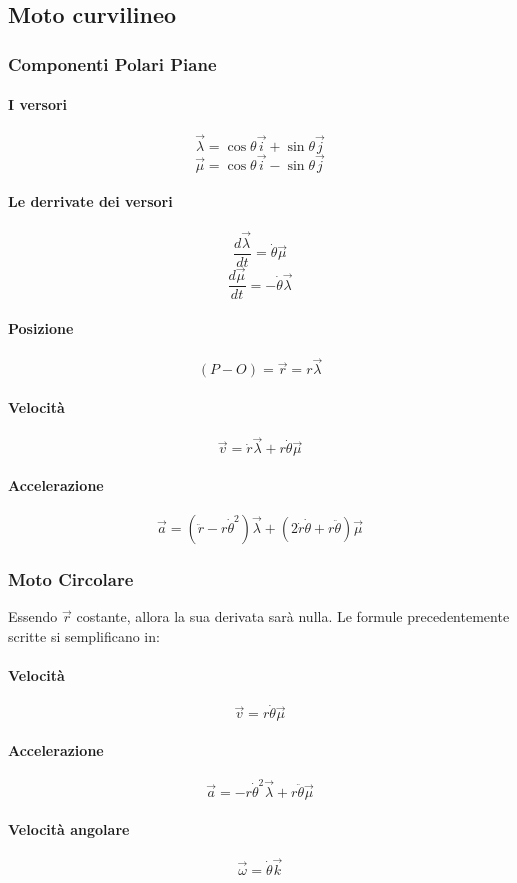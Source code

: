 \documentclass[12pt,a4paper]{report}
\begin{document}
	\subsection{Moto curvilineo}
		\subsubsection{Componenti Polari Piane}
			\paragraph{I versori}						
			\[\vec{\lambda} = \cos\theta\vec{i} + \sin\theta\vec{j}\]
			\[\vec{\mu} = \cos\theta\vec{i} - \sin\theta\vec{j}\]	
			\paragraph{Le derrivate dei versori}		
			\[\frac{d\vec{\lambda}}{dt}=\dot{\theta}\vec{\mu} \] 
			\[\frac{d\vec{\mu}}{dt}=-\dot{\theta}\vec{\lambda}\]
			\paragraph{Posizione}	
			\[(P-O)=\vec{r}=r\vec{\lambda}\]
			\paragraph{Velocità}	
			\[\vec{v}=\dot{r}\vec{\lambda}+r\dot{\theta}\vec{\mu}\]
			\paragraph{Accelerazione}
				\[\vec{a}= (\ddot{r}-r\dot{\theta}^{2})\vec{\lambda}+(2\dot{r}\dot{\theta}+r\ddot{\theta})\vec{\mu}\]
		\subsubsection{Moto Circolare}	
Essendo $\vec{r}$ costante, allora la sua derivata sarà nulla. Le formule precedentemente scritte si semplificano in:
			\paragraph{Velocità}	
			\[\vec{v}=r\dot{\theta}\vec{\mu}\]
			\paragraph{Accelerazione}
			\[\vec{a}= -r\dot{\theta}^{2}\vec{\lambda}+r\ddot{\theta}\vec{\mu}\]
			\paragraph{Velocità angolare}
			\[\vec{\omega}=\dot{\theta}\vec{k}\]
\end{document}
